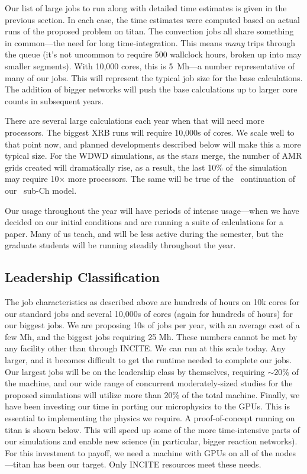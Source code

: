\documentclass[11pt,letterpaper,english]{article}
\begin{document}
Our list of large jobs to run along with detailed time estimates is given in
the previous section.  In each case, the time estimates
were computed based on actual runs of the proposed problem on titan.
The convection jobs all share something in common---the need for long
time-integration.  This means {\em many} trips through the queue (it's
not uncommon to require 500 wallclock hours, broken up into may
smaller segments).  With 10,000 cores, this is 5~Mh---a number
representative of many of our jobs.  This will represent the typical
job size for the base calculations.  The addition of bigger networks
will push the base calculations up to larger core counts in subsequent
years.

There are several large calculations each year when that will need more
processors.  The biggest XRB runs will require 10,000s of cores.  We
scale well to that point now, and planned developments described
below will make this a more typical size.  For the WDWD simulations,
as the stars merge, the number of AMR grids created will dramatically
rise, as a result, the last 10\% of the simulation may require
10$\times$ more processors.  The same will be true of the
\castro\ continuation of our \maestro\ sub-Ch model.

Our usage throughout the year will have periods of intense
usage---when we have decided on our initial conditions and are running
a suite of calculations for a paper.  Many of us teach, and will be
less active during the semester, but the graduate students will be running
steadily throughout the year.


\subsection{Leadership Classification}

The job characteristics as described above are hundreds of hours on
10k cores for our standard jobs and several 10,000s of cores (again
for hundreds of hours) for our biggest jobs.  We are proposing 10s of
jobs per year, with an average cost of a few Mh, and the biggest jobs
requiring 25 Mh.  These numbers cannot be met by any facility other
than through INCITE.  We can run at this scale today.  Any larger, and
it becomes difficult to get the runtime needed to complete our jobs.
Our largest jobs will be on the leadership class by themselves,
requiring $\sim 20$\% of the machine, and our wide range of concurrent
moderately-sized studies for the proposed simulations will utilize
more than 20\% of the total machine.  Finally, we have been investing
our time in porting our microphysics to the GPUs.  This is essential
to implementing the physics we require.  A proof-of-concept
running on titan is shown below.  This will speed up some of the more
time-intensive parts of our simulations and enable new science (in
particular, bigger reaction networks).  For this investment to payoff,
we need a machine with GPUs on all of the nodes---titan has been our
target.  Only INCITE resources meet these needs.
\end{document}
